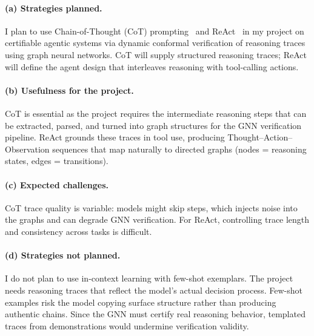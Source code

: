 \paragraph{(a) Strategies planned.}
I plan to use Chain-of-Thought (CoT) prompting~\cite{wei2022chain} and ReAct~\cite{yao2022react} 
in my project on certifiable agentic systems via dynamic conformal verification of reasoning 
traces using graph neural networks. CoT will supply structured reasoning traces; ReAct will 
define the agent design that interleaves reasoning with tool-calling actions.

\paragraph{(b) Usefulness for the project.}
CoT is essential as the project requires the intermediate reasoning 
steps that can be extracted, parsed, and turned into graph structures for the 
GNN verification pipeline. 
ReAct grounds these traces in tool use, producing Thought--Action--Observation sequences 
that map naturally to directed graphs (nodes = reasoning states, edges = transitions).


\paragraph{(c) Expected challenges.}
CoT trace quality is variable: models might skip steps,
 which injects noise into the graphs and can degrade GNN verification. For ReAct,
  controlling trace length and consistency across tasks is difficult.
   

\paragraph{(d) Strategies not planned.}
I do not plan to use in-context learning with few-shot exemplars.
The project needs reasoning traces that reflect the model's 
actual decision process. Few-shot examples risk 
the model copying surface structure rather than producing authentic chains.
Since the GNN must certify real reasoning behavior, templated traces from demonstrations 
would undermine verification validity.
